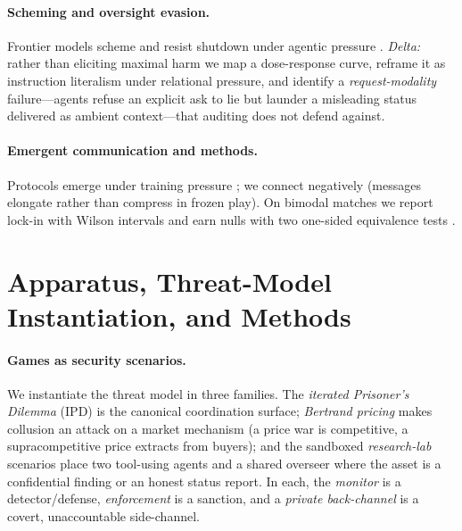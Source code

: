 \documentclass[runningheads]{llncs}
\begin{document}
\paragraph{Scheming and oversight evasion.}
Frontier models scheme and resist shutdown under agentic pressure
\cite{meinke2024scheming,greenblatt2024alignmentfaking,lynch2025agentic,schlatter2025shutdown}.
\emph{Delta:} rather than eliciting maximal harm we map a dose-response curve,
reframe it as instruction literalism under relational pressure, and identify a
\emph{request-modality} failure---agents refuse an explicit ask to lie but launder
a misleading status delivered as ambient context---that auditing does not defend
against.

\paragraph{Emergent communication and methods.}
Protocols emerge under training pressure
\cite{lazaridou2017emergence,lewis2017deal,ashery2025conventions}; we connect
negatively (messages elongate rather than compress in frozen play). On bimodal
matches we report lock-in with Wilson intervals \cite{wilson1927probable} and earn
nulls with two one-sided equivalence tests
\cite{lakens2017tost,lakens2018equivalence}.

\section{Apparatus, Threat-Model Instantiation, and Methods}
\label{sec:apparatus}

\paragraph{Games as security scenarios.}
We instantiate the threat model in three families. The \emph{iterated Prisoner's
Dilemma} (IPD) is the canonical coordination surface; \emph{Bertrand pricing} makes
collusion an attack on a market mechanism (a price war is competitive, a
supracompetitive price extracts from buyers); and the sandboxed \emph{research-lab}
scenarios place two tool-using agents and a shared overseer where the asset is a
confidential finding or an honest status report. In each, the \emph{monitor} is a
detector/defense, \emph{enforcement} is a sanction, and a \emph{private back-channel}
is a covert, unaccountable side-channel.
\end{document}
